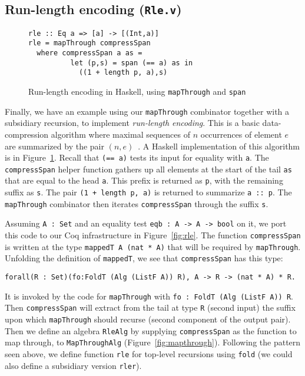 \documentclass[a4paper,USenglish]{lipics-v2021}
\begin{document}
\subsection{Run-length encoding (\texttt{Rle.v})}

\begin{figure}
\begin{verbatim}
rle :: Eq a => [a] -> [(Int,a)]
rle = mapThrough compressSpan
  where compressSpan a as =
          let (p,s) = span (== a) as in
            ((1 + length p, a),s)
\end{verbatim} 
\caption{Run-length encoding in Haskell, using \texttt{mapThrough} and \texttt{span}}
\label{fig:rlehs}
\end{figure}

Finally, we have an example using our \verb|mapThrough| combinator
together with a subsidiary recursion, to implement \emph{run-length
encoding}.  This is a basic data-compression algorithm where maximal
sequences of $n$ occurrences of element $e$ are summarized by the pair
$(n,e)$~\cite{datacomp}.  A Haskell implementation of this algorithm
is in Figure~\ref{fig:rlehs}.
Recall that \verb|(== a)| tests its input for equality with \verb|a|.
The \verb|compressSpan| helper function gathers up all elements at the
start of the tail \verb|as| that are equal to the head \verb|a|.  This
prefix is returned as \verb|p|, with the remaining suffix as \verb|s|.
The pair \verb|(1 + length p, a)| is returned to summarize
\verb|a :: p|.  The \verb|mapThrough| combinator then iterates
\verb|compressSpan| through the suffix \verb|s|.

Assuming \verb|A : Set| and an equality test \verb|eqb : A -> A -> bool| on it,
we port this code to our Coq infrastructure in Figure~\ref{fig:rle}.
The function \verb|compressSpan| is written at the type \verb|mappedT A (nat * A)| that
will be required by \verb|mapThrough|.  Unfolding the definition of \verb|mappedT|, we see that
\verb|compressSpan| has this type:
\begin{verbatim}
forall(R : Set)(fo:FoldT (Alg (ListF A)) R), A -> R -> (nat * A) * R.
\end{verbatim}
\noindent It is invoked by the code for \verb|mapThrough| with \verb|fo : FoldT (Alg (ListF A)) R|.  Then
\verb|compressSpan| will extract from the tail at type \verb|R| (second input) 
the suffix upon which \verb|mapThrough| should recurse (second component
of the output pair).  Then we define an algebra \verb|RleAlg| by
supplying \verb|compressSpan| as the function to map through, to
\verb|MapThroughAlg| (Figure~\ref{fig:mapthrough}).  Following the
pattern seen above, we define function \verb|rle| for top-level
recursions using \verb|fold| (we could also define a subsidiary version
\verb|rler|).
\end{document}
